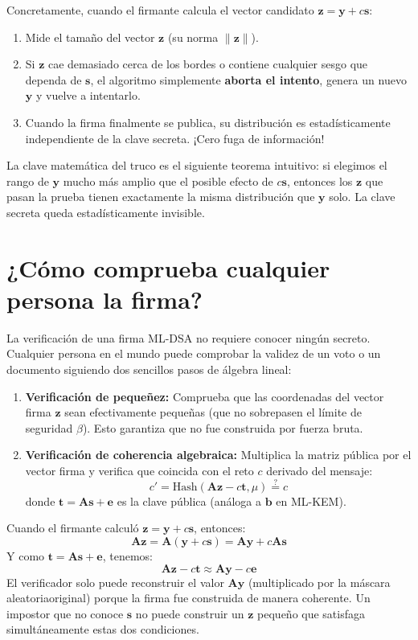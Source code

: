 Concretamente, cuando el firmante calcula el vector candidato $\mathbf{z} = \mathbf{y} + c\mathbf{s}$:
\begin{enumerate}
  \item Mide el tamaño del vector $\mathbf{z}$ (su norma $\|\mathbf{z}\|$).
  \item Si $\mathbf{z}$ cae demasiado cerca de los bordes o contiene cualquier sesgo que dependa de $\mathbf{s}$, el algoritmo simplemente \textbf{aborta el intento}, genera un nuevo $\mathbf{y}$ y vuelve a intentarlo.
  \item Cuando la firma finalmente se publica, su distribución es estadísticamente independiente de la clave secreta. ¡Cero fuga de información!
\end{enumerate}

La clave matemática del truco es el siguiente teorema intuitivo: si elegimos el rango de $\mathbf{y}$ mucho más amplio que el posible efecto de $c\mathbf{s}$, entonces los $\mathbf{z}$ que pasan la prueba tienen exactamente la misma distribución que $\mathbf{y}$ solo. La clave secreta queda estadísticamente invisible.

\section{¿Cómo comprueba cualquier persona la firma?}

La verificación de una firma ML-DSA no requiere conocer ningún secreto. Cualquier persona en el mundo puede comprobar la validez de un voto o un documento siguiendo dos sencillos pasos de álgebra lineal:

\begin{enumerate}
  \item \textbf{Verificación de pequeñez:} Comprueba que las coordenadas del vector firma $\mathbf{z}$ sean efectivamente pequeñas (que no sobrepasen el límite de seguridad $\beta$). Esto garantiza que no fue construida por fuerza bruta.
  \item \textbf{Verificación de coherencia algebraica:} Multiplica la matriz pública por el vector firma y verifica que coincida con el reto $c$ derivado del mensaje:
  \[
  c' = \text{Hash}(\mathbf{Az} - c\mathbf{t}, \mu) \stackrel{?}{=} c
  \]
  donde $\mathbf{t} = \mathbf{As} + \mathbf{e}$ es la clave pública (análoga a $\mathbf{b}$ en ML-KEM).
\end{enumerate}

\begin{intuicion}
Cuando el firmante calculó $\mathbf{z} = \mathbf{y} + c\mathbf{s}$, entonces:
\[
\mathbf{Az} = \mathbf{A}(\mathbf{y} + c\mathbf{s}) = \mathbf{Ay} + c\mathbf{As}
\]
Y como $\mathbf{t} = \mathbf{As} + \mathbf{e}$, tenemos:
\[
\mathbf{Az} - c\mathbf{t} \approx \mathbf{Ay} - c\mathbf{e}
\]
El verificador solo puede reconstruir el valor $\mathbf{Ay}$ (multiplicado por la máscara aleatoriaoriginal) porque la firma fue construida de manera coherente. Un impostor que no conoce $\mathbf{s}$ no puede construir un $\mathbf{z}$ pequeño que satisfaga simultáneamente estas dos condiciones.
\end{intuicion}

